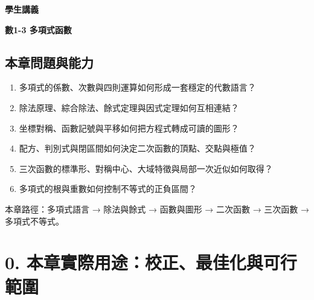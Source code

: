 \documentclass[11pt,a4paper]{article}
\providecommand{\tightlist}{%
  \setlength{\itemsep}{0pt}\setlength{\parskip}{0pt}}
\begin{document}
\begin{tcolorbox}[
  enhanced,colback=white,colframe=HandoutBlue,boxrule=1.1pt,arc=2mm,
  borderline west={3pt}{0pt}{HandoutBlue},left=5mm,right=4mm,top=4mm,bottom=4mm
]
{\sffamily\small\bfseries\color{HandoutBlue}學生講義}\par
{\sffamily\bfseries\LARGE\color{HandoutInk}數1-3 多項式函數}\par
\vspace{0.35em}{\large 用除法、圖形與符號分析連結多項式的局部資訊和整體行為}\par
{}\par
{}\par
\end{tcolorbox}


\begin{HandoutLearningMap}

\subsection{本章問題與能力}\label{ux672cux7ae0ux554fux984cux8207ux80fdux529b}

\begin{enumerate}
\def\labelenumi{\arabic{enumi}.}
\tightlist
\item
  多項式的係數、次數與四則運算如何形成一套穩定的代數語言？
\item
  除法原理、綜合除法、餘式定理與因式定理如何互相連結？
\item
  坐標對稱、函數記號與平移如何把方程式轉成可讀的圖形？
\item
  配方、判別式與閉區間如何決定二次函數的頂點、交點與極值？
\item
  三次函數的標準形、對稱中心、大域特徵與局部一次近似如何取得？
\item
  多項式的根與重數如何控制不等式的正負區間？
\end{enumerate}

本章路徑：多項式語言 → 除法與餘式 → 函數與圖形 → 二次函數 → 三次函數 → 多項式不等式。

\end{HandoutLearningMap}

\section{0. 本章實際用途：校正、最佳化與可行範圍}\label{ux672cux7ae0ux5be6ux969bux7528ux9014ux6821ux6b63ux6700ux4f73ux5316ux8207ux53efux884cux7bc4ux570d}
\end{document}

